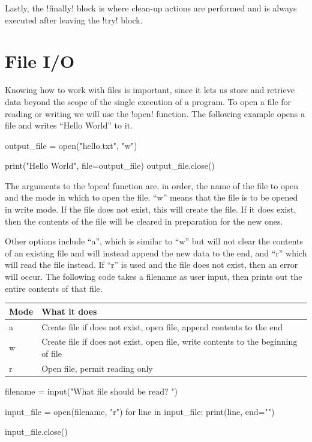 \documentclass[11pt]{cselabheader}
\begin{document}
Lastly, the \pythoninline!finally! block is where clean-up actions are performed and is always executed after leaving the \pythoninline!try! block.
\section{File I/O}
Knowing how to work with files is important, since it lets us store and retrieve
data beyond the scope of the single execution of a program. To open a file for
reading or writing we will use the \pythoninline!open! function. The following
example opens a file and writes ``Hello World'' to it.

\begin{python3code}
output_file = open("hello.txt", "w")

print("Hello World", file=output_file)
output_file.close()
\end{python3code}

The arguments to the \pythoninline!open! function are, in order, the name of the
file to open and the mode in which to open the file. ``w'' means that the file
is to be opened in write mode. If the file does not exist, this will create the
file. If it does exist, then the contents of the file will be cleared in
preparation for the new ones.

Other options include ``a'', which is similar to ``w'' but will not clear the
contents of an existing file and will instead append the new data to the end,
and ``r'' which will read the file instead. If ``r'' is used and the file does
not exist, then an error will occur. The following code takes a filename as user
input, then prints out the entire contents of that file.

\begin{table}[!ht]
  \centering
  \begin{tabular}{ll}
    Mode & What it does \\
    \midrule
    a & Create file if does not exist, open file, append contents to the end \\
    w & Create file if does not exist, open file, write contents to the beginning
    of file \\
    r & Open file, permit reading only \\
  \end{tabular}
\end{table}

\begin{python3code}
filename = input("What file should be read? ")

input_file = open(filename, "r")
for line in input_file:
  print(line, end="")

input_file.close()
\end{python3code}
\end{document}
